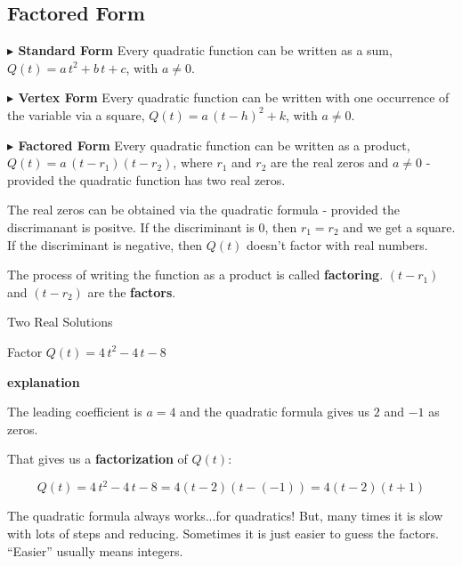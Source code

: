 \documentclass{ximera}
\begin{document}
\subsection*{Factored Form}

\textbf{\textcolor{red!70!darkgray}{$\blacktriangleright$ Standard Form}} Every quadratic function can be written as a sum, $Q(t) = a \, t^2 + b \, t + c$, with $a \ne 0$. 



\textbf{\textcolor{red!70!darkgray}{$\blacktriangleright$ Vertex Form}} Every quadratic function can be written with one occurrence of the variable via a square, $Q(t) = a \, (t - h)^2 + k$, with $a \ne 0$. 



\textbf{\textcolor{red!70!darkgray}{$\blacktriangleright$ Factored Form}} Every quadratic function can be written as a product, $Q(t) = a \, (t - r_1)(t - r_2)$, where $r_1$ and $r_2$ are the real zeros and $a \ne 0$ - provided the quadratic function has two real zeros. 





The real zeros can be obtained via the quadratic formula - provided the discrimanant is positve.  If the discriminant is $0$, then $r_1 = r_2$ and we get a square.  If the discriminant is negative, then $Q(t)$ doesn't factor with real numbers.  


The process of writing the function as a product is called \textbf{factoring}. $(t - r_1)$  and $(t - r_2)$ are the \textbf{factors}.



\begin{example} Two Real Solutions

Factor $Q(t) = 4 \, t^2 - 4 \, t - 8$ 

\textbf{\textcolor{red!75!green}{explanation}} 

The leading coefficient is $a=4$ and the quadratic formula gives us $2$ and $-1$ as zeros.  

That gives us a \textbf{factorization} of $Q(t)$:



\[    Q(t) = 4 \, t^2 - 4 \, t - 8 =  4 (t-2)(t-(-1))    = 4 (t-2)(t+1)         \]



\end{example}



The quadratic formula always works...for quadratics!  But, many times it is slow with lots of steps and reducing.  Sometimes it is just easier to guess the factors.  ``Easier'' usually means integers.
\end{document}
